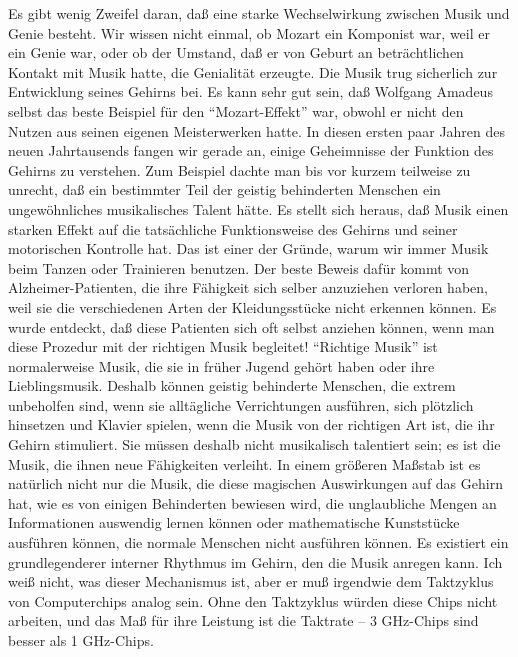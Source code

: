 Es gibt wenig Zweifel daran, daß eine starke Wechselwirkung zwischen Musik und Genie besteht.
Wir wissen nicht einmal, ob Mozart ein Komponist war, weil er ein Genie war, oder ob der Umstand, daß er von Geburt an beträchtlichen Kontakt mit Musik hatte, die Genialität erzeugte.
Die Musik trug sicherlich zur Entwicklung seines Gehirns bei.
Es kann sehr gut sein, daß Wolfgang Amadeus selbst das beste Beispiel für den \enquote{Mozart-Effekt} war, obwohl er nicht den Nutzen aus seinen eigenen Meisterwerken hatte.
In diesen ersten paar Jahren des neuen Jahrtausends fangen wir gerade an, einige Geheimnisse der Funktion des Gehirns zu verstehen.
Zum Beispiel dachte man bis vor kurzem teilweise zu unrecht, daß ein bestimmter Teil der geistig behinderten Menschen ein ungewöhnliches musikalisches Talent hätte.
Es stellt sich heraus, daß Musik einen starken Effekt auf die tatsächliche Funktionsweise des Gehirns und seiner motorischen Kontrolle hat.
Das ist einer der Gründe, warum wir immer Musik beim Tanzen oder Trainieren benutzen.
Der beste Beweis dafür kommt von Alzheimer-Patienten, die ihre Fähigkeit sich selber anzuziehen verloren haben, weil sie die verschiedenen Arten der Kleidungsstücke nicht erkennen können.
Es wurde entdeckt, daß diese Patienten sich oft selbst anziehen können, wenn man diese Prozedur mit der richtigen Musik begleitet!
\enquote{Richtige Musik} ist normalerweise Musik, die sie in früher Jugend gehört haben oder ihre Lieblingsmusik.
Deshalb können geistig behinderte Menschen, die extrem unbeholfen sind, wenn sie alltägliche Verrichtungen ausführen, sich plötzlich hinsetzen und Klavier spielen, wenn die Musik von der richtigen Art ist, die ihr Gehirn stimuliert.
Sie müssen deshalb nicht musikalisch talentiert sein; es ist die Musik, die ihnen neue Fähigkeiten verleiht.
In einem größeren Maßstab ist es natürlich nicht nur die Musik, die diese magischen Auswirkungen auf das Gehirn hat, wie es von einigen Behinderten bewiesen wird, die unglaubliche Mengen an Informationen auswendig lernen können oder mathematische Kunststücke ausführen können, die normale Menschen nicht ausführen können.
Es existiert ein grundlegenderer interner Rhythmus im Gehirn, den die Musik anregen kann.
Ich weiß nicht, was dieser Mechanismus ist, aber er muß irgendwie dem Taktzyklus von Computerchips analog sein.
Ohne den Taktzyklus würden diese Chips nicht arbeiten, und das Maß für ihre Leistung ist die Taktrate -- 3 GHz-Chips sind besser als 1 GHz-Chips.

